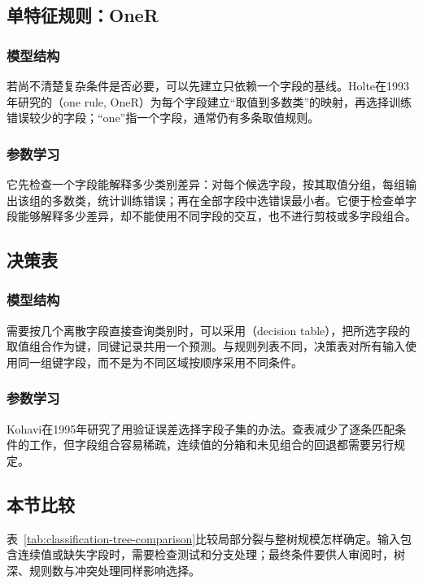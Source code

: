 \subsection{单特征规则：OneR}
\label{sec:classification-oner}

\subsubsection{模型结构}
若尚不清楚复杂条件是否必要，可以先建立只依赖一个字段的基线。Holte在1993年研究的（one rule, OneR）为每个字段建立“取值到多数类”的映射，再选择训练错误较少的字段；“one”指一个字段，通常仍有多条取值规则。

\subsubsection{参数学习}
它先检查一个字段能解释多少类别差异：对每个候选字段，按其取值分组，每组输出该组的多数类，统计训练错误；再在全部字段中选错误最小者。它便于检查单字段能够解释多少差异，却不能使用不同字段的交互，也不进行剪枝或多字段组合。

\subsection{决策表}
\label{sec:classification-decision-table}

\subsubsection{模型结构}
需要按几个离散字段直接查询类别时，可以采用（decision table），把所选字段的取值组合作为键，同键记录共用一个预测。与规则列表不同，决策表对所有输入使用同一组键字段，而不是为不同区域按顺序采用不同条件。

\subsubsection{参数学习}
Kohavi在1995年研究了用验证误差选择字段子集的办法。查表减少了逐条匹配条件的工作，但字段组合容易稀疏，连续值的分箱和未见组合的回退都需要另行规定。

\subsection{本节比较}
\label{sec:classification-trees-comparison}

表~\ref{tab:classification-tree-comparison}比较局部分裂与整树规模怎样确定。输入包含连续值或缺失字段时，需要检查测试和分支处理；最终条件要供人审阅时，树深、规则数与冲突处理同样影响选择。

